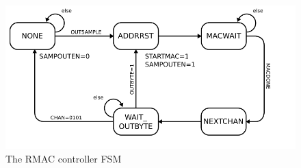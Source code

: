 \begin{figure}
\label{rmaccontrollerfsm}
\includegraphics[scale=1.0]{RMACcontrol.fsm.svg}
\caption{The RMAC controller FSM}
\end{figure}
